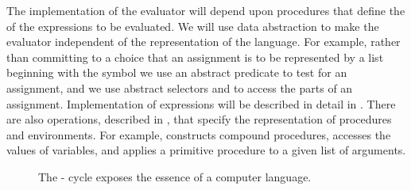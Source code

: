 The implementation of the evaluator will depend upon procedures that define the  of the expressions to be evaluated.
We will use data abstraction to make the evaluator independent of the representation of the language.
For example, rather than committing to a choice that an assignment is to be represented by a list beginning with the symbol  we use an abstract predicate  to test for an assignment, and we use abstract selectors  and  to access the parts of an assignment.
Implementation of expressions will be described in detail in .
There are also operations, described in , that specify the representation of procedures and environments.
For example,  constructs compound procedures,  accesses the values of variables, and  applies a primitive procedure to a given list of arguments.

\begin{figure}[tb]
	\centering
	
	\caption{
		The - cycle exposes the essence of a computer language.
	}
	\label{Figure 4.1}
\end{figure}








